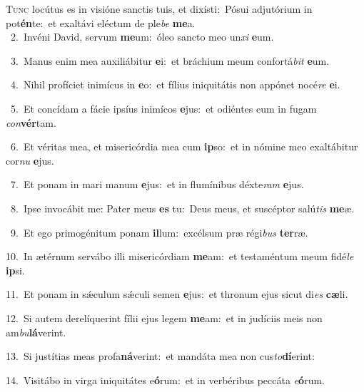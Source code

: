 \lettrine{\initial\textcolor{\initialcolor}{T}}{unc} locútus es in visióne sanctis tuis, et dixísti:~\dagger Pósui adjutórium in pot\-\textbf{én}\-te:~\star et exaltávi eléctum de ple\textit{be} \textbf{me}\-a.\\
{\numbfont\textcolor{\numbcolor}{~2.}}~Invéni David, servum \textbf{me}\-um:~\star óleo sancto meo un\textit{xi} \textbf{e}\-um.\par
{\numbfont\textcolor{\numbcolor}{~3.}}~Manus enim mea auxiliábitur \textbf{e}\-i:~\star et bráchium meum confortá\textit{bit} \textbf{e}\-um.\par
{\numbfont\textcolor{\numbcolor}{~4.}}~Nihil profíciet inimícus in \textbf{e}\-o:~\star et fílius iniquitátis non appónet nocé\textit{re} \textbf{e}\-i.\par
{\numbfont\textcolor{\numbcolor}{~5.}}~Et concídam a fácie ipsíus inimícos \textbf{e}\-jus:~\star et odiéntes eum in fugam \textit{con}\-\textbf{vér}tam.\par
{\numbfont\textcolor{\numbcolor}{~6.}}~Et véritas mea, et misericórdia mea cum \textbf{ip}\-so:~\star et in nómine meo exaltábitur cor\textit{nu} \textbf{e}\-jus.\par
{\numbfont\textcolor{\numbcolor}{~7.}}~Et ponam in mari manum \textbf{e}\-jus:~\star et in flumínibus déxte\textit{ram} \textbf{e}\-jus.\par
{\numbfont\textcolor{\numbcolor}{~8.}}~Ipse invocábit me: Pater meus \textbf{es} tu:~\star Deus meus, et suscéptor salú\textit{tis} \textbf{me}\-æ.\par
{\numbfont\textcolor{\numbcolor}{~9.}}~Et ego primogénitum ponam \textbf{il}\-lum:~\star excélsum præ régi\textit{bus} \textbf{ter}\-ræ.\par
{\numbfont\textcolor{\numbcolor}{10.}}~In ætérnum servábo illi misericórdiam \textbf{me}\-am:~\star et testaméntum meum fidé\textit{le} \textbf{ip}\-si.\par
{\numbfont\textcolor{\numbcolor}{11.}}~Et ponam in sǽculum sǽculi semen \textbf{e}\-jus:~\star et thronum ejus sicut di\textit{es} \textbf{cæ}\-li.\par
{\numbfont\textcolor{\numbcolor}{12.}}~Si autem derelíquerint fílii ejus legem \textbf{me}\-am:~\star et in judíciis meis non am\-\textit{bu}\-\textbf{lá}verint.\par
{\numbfont\textcolor{\numbcolor}{13.}}~Si justítias meas profa\-\textbf{ná}\-verint:~\star et mandáta mea non cus\-\textit{to}\-\textbf{dí}erint:\par
{\numbfont\textcolor{\numbcolor}{14.}}~Visitábo in virga iniquitátes e\-\textbf{ó}\-rum:~\star et in verbéribus peccáta \textit{e}\-\textbf{ó}rum.\par
